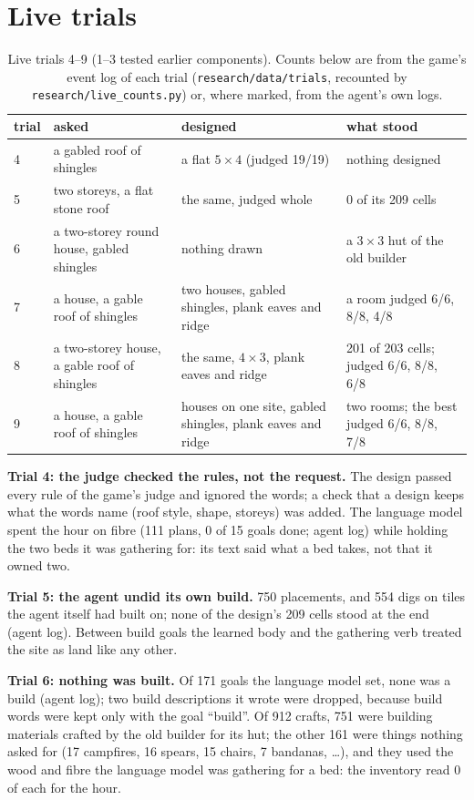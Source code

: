 \section*{Live trials}
\begin{table}[h]\centering
\begin{tabular}{llll}\toprule
trial & asked & designed & what stood\\\midrule
4 & a gabled roof of shingles & a flat $5\times4$ (judged 19/19) & nothing designed\\
5 & two storeys, a flat stone roof & the same, judged whole & 0 of its 209 cells\\
6 & a two-storey round house, gabled shingles & nothing drawn & a $3\times3$ hut of the old builder\\
7 & a house, a gable roof of shingles & two houses, gabled shingles, plank eaves and ridge & a room judged 6/6, 8/8, 4/8\\
8 & a two-storey house, a gable roof of shingles & the same, $4\times3$, plank eaves and ridge & 201 of 203 cells; judged 6/6, 8/8, 6/8\\
9 & a house, a gable roof of shingles & houses on one site, gabled shingles, plank eaves and ridge & two rooms; the best judged 6/6, 8/8, 7/8\\\bottomrule
\end{tabular}\caption{Live trials 4--9 (1--3 tested earlier components). Counts below are from the game's event
log of each trial (\texttt{research/data/trials}, recounted by \texttt{research/live\_counts.py}) or, where marked,
from the agent's own logs.}
\end{table}

\textbf{Trial 4: the judge checked the rules, not the request.} The design passed every rule of the game's judge and
ignored the words; a check that a design keeps what the words name (roof style, shape, storeys) was added. The language
model spent the hour on fibre (111 plans, 0 of 15 goals done; agent log) while holding the two beds it was gathering for:
its text said what a bed takes, not that it owned two.

\textbf{Trial 5: the agent undid its own build.} 750 placements, and 554 digs on tiles the agent itself had built on;
none of the design's 209 cells stood at the end (agent log). Between build goals the learned body and the gathering verb
treated the site as land like any other.

\textbf{Trial 6: nothing was built.} Of 171 goals the language model set, none was a build (agent log); two build
descriptions it wrote were dropped, because build words were kept only with the goal ``build''. Of 912 crafts, 751 were
building materials crafted by the old builder for its hut; the other 161 were things nothing asked for (17 campfires,
16 spears, 15 chairs, 7 bandanas, \dots), and they used the wood and fibre the language model was gathering for a bed:
the inventory read 0 of each for the hour.

